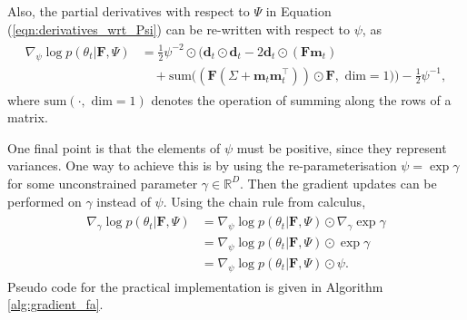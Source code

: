 \documentclass[msc,deptreport.inf]{infthesis} %
\newcommand{\matr}[1]{\mathbf{#1}}
\newcommand{\R}{\mathbb R}
\begin{document}
Also, the partial derivatives with respect to $\Psi$ in Equation (\ref{eqn:derivatives_wrt_Psi}) can be re-written with respect to $\psi$, as 
\begin{align}
\begin{split}\label{eqn:efficient_derivatives_wrt_Psi}
	\nabla_{\psi} \log p(\theta_t | \matr{F}, \Psi) 
	& = \frac{1}{2} \psi^{-2} \odot \Big(\matr{d}_t \odot \matr{d}_t - 2\matr{d}_t \odot (\matr{F} \matr{m}_t) \\
	& \quad + \text{sum}\big((\matr{F} (\Sigma + \matr{m}_t \matr{m}_t^\intercal)) \odot \matr{F}, \text{ dim} = 1\big) \Big)
	 - \frac{1}{2} \psi^{-1},
\end{split}
\end{align} 
where $\text{sum}(\cdot, \text{ dim} = 1)$ denotes the operation of summing along the rows of a matrix. 

One final point is that the elements of $\psi$ must be positive, since they represent variances. One way to achieve this is by using the re-parameterisation $\psi = \exp \gamma$ for some unconstrained parameter $\gamma \in \R^D$. Then the gradient updates can be performed on $\gamma$ instead of $\psi$. Using the chain rule from calculus, 
\begin{align}
\begin{split}\label{eqn:efficient_derivatives_wrt_gamma}
	\nabla_{\gamma} \log p(\theta_t | \matr{F}, \Psi)
	& = \nabla_{\psi} \log p(\theta_t | \matr{F}, \Psi) \odot \nabla_\gamma \exp \gamma \\
	& = \nabla_{\psi} \log p(\theta_t | \matr{F}, \Psi) \odot \exp \gamma \\
	& = \nabla_{\psi} \log p(\theta_t | \matr{F}, \Psi) \odot \psi.
\end{split}
\end{align} 
Pseudo code for the practical implementation is given in Algorithm \ref{alg:gradient_fa}.
\end{document}
